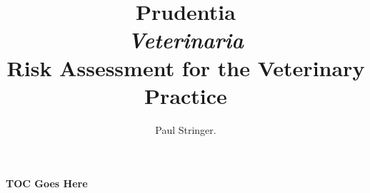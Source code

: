 \documentclass[oneside]{book}
\begin{document}


\title{
  {\Huge\bfseries Prudentia} \\[6pt]
  {\LARGE\itshape Veterinaria} \\[10pt]
  {\Large Risk Assessment for the Veterinary Practice}
}
\author{Paul Stringer.}
\date{}
\maketitle

\paragraph{TOC Goes Here}
\newpage











































\end{document}
